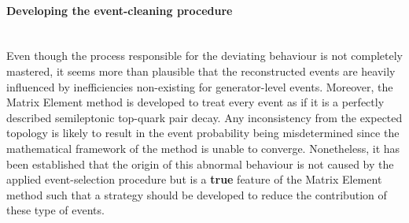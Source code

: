 
\paragraph{Developing the event-cleaning procedure} \hfill \\

Even though the process responsible for the deviating behaviour is not completely mastered, it seems more than plausible that the reconstructed events are heavily influenced by inefficiencies non-existing for generator-level events. Moreover, the Matrix Element method is developed to treat every event as if it is a perfectly described semileptonic top-quark pair decay. Any inconsistency from the expected topology is likely to result in the event probability being misdetermined since the mathematical framework of the method is unable to converge.
Nonetheless, it has been established that the origin of this abnormal behaviour is not caused by the applied event-selection procedure but is a \textbf{true} feature of the Matrix Element method such that a strategy should be developed to reduce the contribution of these type of events.
\\

